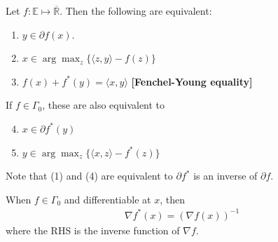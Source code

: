 \documentclass{tufte-handout}
\begin{document}
\begin{Theorem}
    Let \( f:\mathbb{E}\mapsto \overline{\mathbb{R}} \). Then 
    the following are equivalent:
    \begin{enumerate}
        \item \( y \in \partial f (x) \).
        \item \( x \in \arg\max_z\{\langle z, y \rangle - f(z)\} \)
        \item \( f(x) + f^*(y) = \langle x, y \rangle \) \textbf{[Fenchel-Young equality]}
    \end{enumerate}
    If \( f \in \Gamma_0\), these are also equivalent to
    \begin{enumerate}
        \setcounter{enumi}{3}
        \item \( x \in \partial f^*(y) \)
        \item \( y \in \arg\max_z\{\langle x, z \rangle - f^*(z)\} \)
    \end{enumerate}
    Note that (1) and (4) are equivalent to \( \partial f^* \) 
    is an inverse of \( \partial f \).
\end{Theorem}
When \( f\in \Gamma_0 \) and differentiable at \( x \), then 
\begin{align}
 \nabla f^* (x) = (\nabla f(x))^{-1}  
\end{align}
where the RHS is the inverse function of \( \nabla f \).
\end{document}
